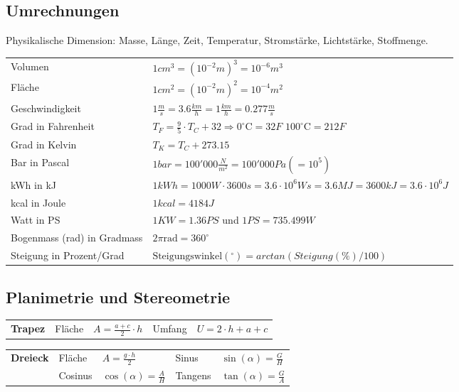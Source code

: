 \documentclass[
a4paper,
oneside,
landscape, 
8pt,
]{scrartcl}
\begin{document}
\begin{multicols*}{2}
\subsection{Umrechnungen}
Physikalische Dimension: Masse, Länge, Zeit, Temperatur, Stromstärke, Lichtstärke, Stoffmenge.
\begin{tabbing}
	\begin{tabu} to \linewidth {l X}
		\toprule
		Volumen & $1cm^3 = (10^{-2}m)^3 = 10^{-6}m^3$ \\ 
		Fläche &  $1cm^2 = (10^{-2}m)^2 = 10^{-4}m^2$ \\
		Geschwindigkeit & $1\frac{m}{s} = 3.6\frac{km}{h} = 1\frac{km}{h} = 0.277 \frac{m}{s}$ \\
		Grad in Fahrenheit & $T_F = \frac{9}{5} \cdot T_C + 32 \Rightarrow 0^\circ\text{C} = 32F$  $100^\circ\text{C} = 212F$ \\ 
		Grad in Kelvin & $T_K = T_C + 273.15$ \\
		Bar in Pascal & $1 bar = 100'000 \frac{N}{m^2} = 100'000 Pa (=10^5)$ \\
		kWh in kJ & $1kWh = 1000W \cdot 3600 s= 3.6 \cdot 10^6 Ws = 3.6 MJ = 3600kJ = 3.6 \cdot 10^6 J$ \\
		kcal in Joule & $1kcal = 4184 J$ \\
		Watt in PS & $1KW = 1.36PS$ und $1PS = 735.499W$ \\
		Bogenmass (rad) in Gradmass & $2\pi \mathrm{rad} = 360^\circ $\\
		Steigung in Prozent/Grad & $\text{Steigungswinkel}(^\circ) = arctan( Steigung(\%) / 100 )$ \\	
		\bottomrule
	\end{tabu}
\end{tabbing}

\subsection{Planimetrie und Stereometrie}

\begin{tabbing}
	\begin{tabu} to \linewidth {l l X l X}
		\toprule
		\textbf{Trapez} & Fläche & $A = \frac{a + c}{2} \cdot h$ & 
		Umfang & $U = 2 \cdot h  + a + c$ \\
	\end{tabu}
\end{tabbing}

\begin{tabbing}
	\begin{tabu} to \linewidth {l l X l X}
		\textbf{Dreieck} & Fläche & $A = \frac{g \cdot h}{2}$ & 
		Sinus & $\sin(\alpha) = \frac{G}{H}$ \\
		& Cosinus & $\cos(\alpha) = \frac{A}{H}$ &
		Tangens &  $\tan(\alpha) = \frac{G}{A}$ \\
	\end{tabu}
\end{tabbing}



\end{multicols*}
\end{document}
